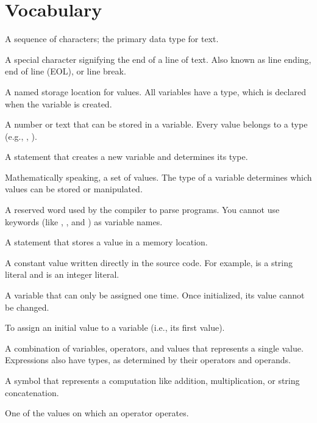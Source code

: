 \section{Vocabulary}

\begin{description}

A sequence of characters; the primary data type for text.

A special character signifying the end of a line of text.
Also known as line ending, end of line (EOL), or line break.

A named storage location for values.
All variables have a type, which is declared when the variable is created.

A number or text that can be stored in a variable.
Every value belongs to a type (e.g., , ).

A statement that creates a new variable and determines its type.

Mathematically speaking, a set of values.
The type of a variable determines which values can be stored or manipulated.

A reserved word used by the compiler to parse programs.
You cannot use keywords (like , , and ) as variable names.

A statement that stores a value in a memory location.

A constant value written directly in the source code.
For example,  is a string literal and  is an integer literal.

A variable that can only be assigned one time.
Once initialized, its value cannot be changed.

To assign an initial value to a variable (i.e., its first value).

A combination of variables, operators, and values that represents a single value.
Expressions also have types, as determined by their operators and operands.

A symbol that represents a computation like addition, multiplication, or string concatenation.

One of the values on which an operator operates.


\end{description}

